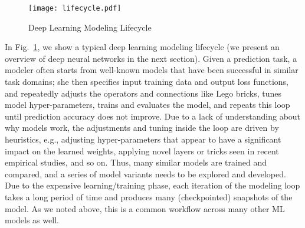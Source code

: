 \documentclass[conference]{IEEEtran}
\begin{document}
\begin{figure}[!t]
\centering
\texttt{[image: lifecycle.pdf]}
\caption{Deep Learning Modeling Lifecycle}
\label{fig:lifecycle}
\end{figure}


In Fig.~\ref{fig:lifecycle}, we show a typical deep learning modeling lifecycle (we present an overview of deep neural networks in the next section). Given a prediction task, a modeler often starts from well-known models that have been successful in similar task domains; she then specifies input training data and output loss functions, and repeatedly adjusts the \dnn\on operators
and connections like Lego bricks, tunes model hyper-parameters, trains and evaluates the model, and repeats this loop until prediction accuracy does not improve. Due to a lack of understanding about why models work, the adjustments and tuning inside the loop are driven by heuristics, e.g.,
adjusting hyper-parameters that appear to have a significant impact on the learned weights, applying novel layers or tricks seen in recent empirical studies, and so on. Thus, many similar models are trained and compared, and a series of model variants needs to be explored and developed. 
Due to the expensive learning/training phase, each iteration of the modeling loop takes a long period of time 
and produces many (checkpointed) snapshots of the model. As we noted above, this is a common workflow across many other ML models as well.
\end{document}
